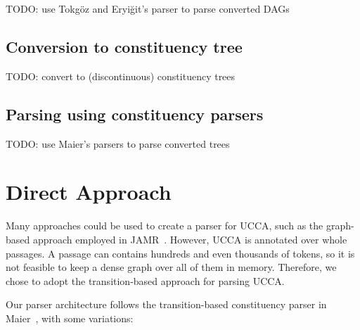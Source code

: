 \documentclass[11pt]{article}
\begin{document}
TODO: use Tokg\"oz and Eryi\u{g}it's parser to parse converted DAGs \cite{tokgoz2015transition}

\subsection{Conversion to constituency tree}

TODO: convert to (discontinuous) constituency trees

\subsection{Parsing using constituency parsers}

TODO: use Maier's parsers to parse converted trees

\section{Direct Approach}

Many approaches could be used to create a parser for UCCA, such as the graph-based approach
employed in JAMR~\cite{flanigan2014discriminative}.
However, UCCA is annotated over whole passages. A passage can contains hundreds and even thousands of tokens, so it is not feasible to keep a dense graph over all of them in memory. Therefore, we chose to adopt the transition-based approach for parsing UCCA.

Our parser architecture follows the transition-based constituency parser in Maier~, with some variations:
\end{document}
